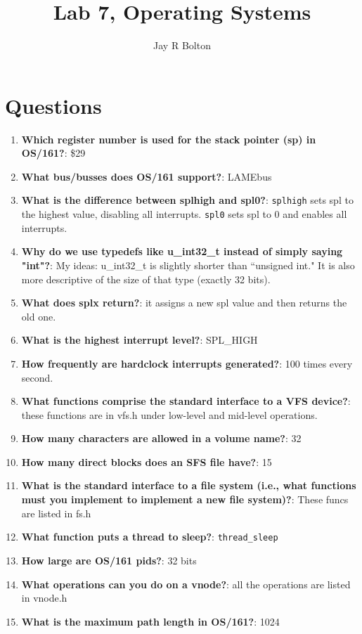 \documentclass{article}
\title{Lab 7, Operating Systems}
\author{Jay R Bolton}
\begin{document}
\maketitle

\section{Questions}
\begin{enumerate}


\item
\textbf{Which register number is used for the stack pointer (sp) in OS/161?}: \$29
\item
\textbf{What bus/busses does OS/161 support?}: LAMEbus
\item
\textbf{What is the difference between splhigh and spl0?}: \texttt{splhigh}
sets spl to the highest value, disabling all interrupts. \texttt{spl0} sets spl
to 0 and enables all interrupts.
\item
\textbf{Why do we use typedefs like u\_int32\_t instead of simply saying "int"?}:
My ideas: u\_int32\_t is slightly shorter than ``unsigned int." It is also more
descriptive of the size of that type (exactly 32 bits).
\item
\textbf{What does splx return?}: it assigns a new spl value and then returns
the old one.
\item
\textbf{What is the highest interrupt level?}: SPL\_HIGH
\item
\textbf{How frequently are hardclock interrupts generated?}: 100 times every second.
\item
\textbf{What functions comprise the standard interface to a VFS device?}: these
functions are in vfs.h under low-level and mid-level operations.
\item
\textbf{How many characters are allowed in a volume name?}: 32
\item
\textbf{How many direct blocks does an SFS file have?}: 15
\item
\textbf{What is the standard interface to a file system (i.e., what functions
must you implement to implement a new file system)?}: These funcs are listed in
fs.h
\item
\textbf{What function puts a thread to sleep?}: \texttt{thread\_sleep}
\item
\textbf{How large are OS/161 pids?}: 32 bits
\item
\textbf{What operations can you do on a vnode?}: all the operations are listed
in vnode.h
\item
\textbf{What is the maximum path length in OS/161?}: 1024

\end{enumerate}
\end{document}
